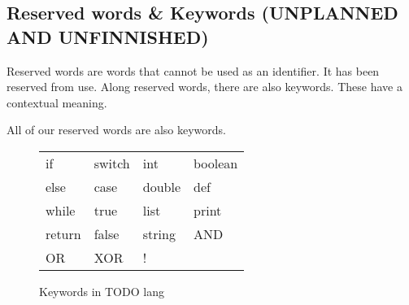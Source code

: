 \subsection{Reserved words \& Keywords (UNPLANNED AND UNFINNISHED)}
Reserved words are words that cannot be used as an identifier. It has been reserved from use.
Along reserved words, there are also keywords. These have a contextual meaning.

All of our reserved words are also keywords.

\begin{figure}[h]
\begin{tabular}{llll}
if     & switch & int    & boolean \\
else   & case   & double & def     \\
while  & true   & list   & print   \\
return & false  & string & AND     \\
OR     & XOR    & !      &        
\end{tabular}
\caption{Keywords in TODO lang}
\label{fig:keywords}
\end{figure}





